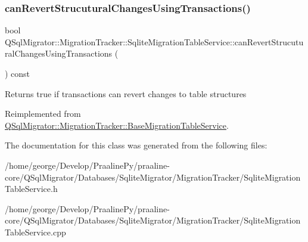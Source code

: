 \subsubsection{\texorpdfstring{can\+Revert\+Strucutural\+Changes\+Using\+Transactions()}{canRevertStrucuturalChangesUsingTransactions()}}
{\footnotesize\ttfamily bool Q\+Sql\+Migrator\+::\+Migration\+Tracker\+::\+Sqlite\+Migration\+Table\+Service\+::can\+Revert\+Strucutural\+Changes\+Using\+Transactions (\begin{DoxyParamCaption}{ }\end{DoxyParamCaption}) const\hspace{0.3cm}{\ttfamily [virtual]}}

\begin{DoxyReturn}{Returns}
true if transactions can revert changes to table structures 
\end{DoxyReturn}


Reimplemented from \hyperlink{class_q_sql_migrator_1_1_migration_tracker_1_1_base_migration_table_service_aea5fa9e4804a436221180560efeab253}{Q\+Sql\+Migrator\+::\+Migration\+Tracker\+::\+Base\+Migration\+Table\+Service}.



The documentation for this class was generated from the following files\+:\begin{DoxyCompactItemize}
\item 
/home/george/\+Develop/\+Praaline\+Py/praaline-\/core/\+Q\+Sql\+Migrator/\+Databases/\+Sqlite\+Migrator/\+Migration\+Tracker/Sqlite\+Migration\+Table\+Service.\+h\item 
/home/george/\+Develop/\+Praaline\+Py/praaline-\/core/\+Q\+Sql\+Migrator/\+Databases/\+Sqlite\+Migrator/\+Migration\+Tracker/Sqlite\+Migration\+Table\+Service.\+cpp\end{DoxyCompactItemize}
